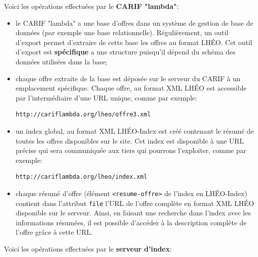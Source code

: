 \medskip
\noindent Voici les opérations effectuées par le \textbf{CARIF "lambda"}:

\begin{itemize} 
  
\item le CARIF "lambda" a une base d'offres dans un système de
  gestion de base de données (par exemple une base
  relationnelle). Régulièrement, un outil d'export permet
  d'extraire de cette base les offres au format LHÉO. Cet outil
  d'export est \textbf{spécifique} a une structure puisqu'il
  dépend du schéma des données utilisées dans la base;
  
\item chaque offre extraite de la base est déposée sur le
  serveur du CARIF à un emplacement spécifique. Chaque offre, au
  format XML LHÉO est accessible par l'intermédiaire d'une URL
  unique, comme par exemple:
  
  \begin{center}
\begin{verbatim}
http://cariflambda.org/lheo/offre3.xml
\end{verbatim}
  \end{center}
  
\item un index global, au format XML LHÉO-Index est créé
  contenant le résumé de toutes les offres disponibles sur le
  site. Cet index est disponible à une URL précise qui sera
  communiquée aux tiers qui pourrons l'exploiter, comme par
  exemple:
  
  \begin{center}
\begin{verbatim}
http://cariflambda.org/lheo/index.xml
\end{verbatim}
  \end{center}
  
\item chaque résumé d'offre (élément
  \texttt{<resume-offre>} de l'index en LHÉO-Index) contient
  dans l'attribut \texttt{file} l'URL de l'offre complète en
  format XML LHÉO disponible sur le serveur. Ainsi, en faisant une
  recherche dans l'index avec les informations résumées, il est
  possible d'accéder à la description complète de l'offre grâce à
  cette URL.
\end{itemize}

\medskip
\noindent Voici les opérations effectuées par le \textbf{serveur d'index}:

